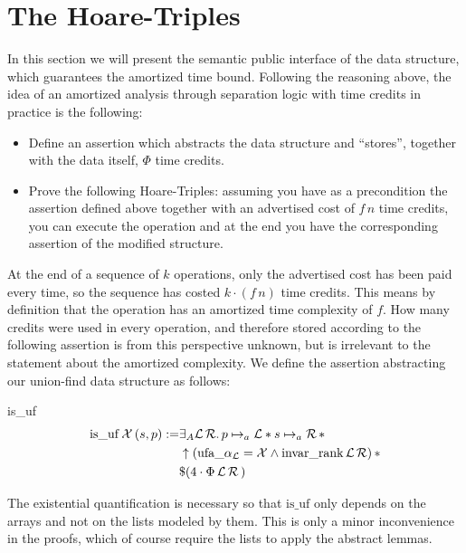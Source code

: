 \documentclass[headsepline,footsepline,footinclude=false,oneside,fontsize=11pt,paper=a4,listof=totoc,bibliography=totoc]{scrbook} %
\begin{document}
\section{The Hoare-Triples}

In this section we will present the semantic public interface of the data structure, which guarantees the amortized time bound. Following the reasoning above, the idea of an amortized analysis through separation logic with time credits in practice is the following: 
\begin{itemize}
	\item Define an assertion which abstracts the data structure and ``stores'', together with the data itself, $\Phi$ time credits.
	\item Prove the following Hoare-Triples: assuming you have as a precondition the assertion defined above together with an advertised cost of $f\, n$ time credits, you can execute the operation and at the end you have the corresponding assertion of the modified structure.
\end{itemize}

At the end of a sequence of $k$ operations, only the advertised cost has been paid every time, so the sequence has costed $k \cdot (f\, n)$ time credits. This means by definition that the operation has an amortized time complexity of $f$. How many credits were used in every operation, and therefore stored according to the following assertion is from this perspective unknown, but is irrelevant to the statement about the amortized complexity.
We define the assertion abstracting our union-find data structure as follows:

\begin{definition}{is\_uf}
	\begin{align}
	\begin{split}
	\mathrm{is\_uf}\, \mathcal{X} \, (s,p) := 
	&\exists_A \mathcal{L}\, \mathcal{R}.\, p \mapsto_a \mathcal{L} * s \mapsto_a \mathcal{R}\, * \\
	&\uparrow (\mathrm{ufa\_}\alpha_\mathcal{L} = \mathcal{X} \land \mathrm{invar\_rank}\, \mathcal{L} \, \mathcal{R})\, * \\
	&\$(4\cdot\Phi\, \mathcal{L}\, \mathcal{R}\,)
	\end{split}
	\end{align}
	
The existential quantification is necessary so that $\mathrm{is\_uf}$ only depends on the arrays and not on the lists modeled by them. This is only a minor inconvenience in the proofs, which of course require the lists to apply the abstract lemmas.
\end{definition}
\end{document}
